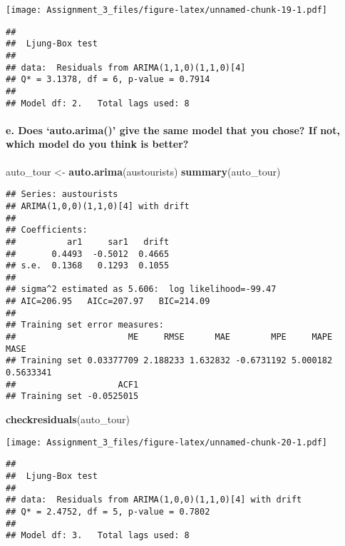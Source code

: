 \documentclass[]{article}
\newenvironment{Shaded}{\begin{snugshade}}{\end{snugshade}}
\newcommand{\KeywordTok}[1]{\textcolor[rgb]{0.13,0.29,0.53}{\textbf{#1}}}
\newcommand{\StringTok}[1]{\textcolor[rgb]{0.31,0.60,0.02}{#1}}
\newcommand{\NormalTok}[1]{#1}
\let\oldparagraph\paragraph
\renewcommand{\paragraph}[1]{\oldparagraph{#1}\mbox{}}
\begin{document}
\texttt{[image: Assignment\_3\_files/figure-latex/unnamed-chunk-19-1.pdf]}

\begin{verbatim}
## 
##  Ljung-Box test
## 
## data:  Residuals from ARIMA(1,1,0)(1,1,0)[4]
## Q* = 3.1378, df = 6, p-value = 0.7914
## 
## Model df: 2.   Total lags used: 8
\end{verbatim}

\paragraph{\texorpdfstring{e. Does `auto.arima()' give the same model
that you chose? If not, which model do you think is
better?}{e. Does auto.arima() give the same model that you chose? If not, which model do you think is better?}}\label{e.-does-auto.arima-give-the-same-model-that-you-chose-if-not-which-model-do-you-think-is-better}

\begin{Shaded}
\begin{Highlighting}[]
\NormalTok{auto_tour <-}\StringTok{ }\KeywordTok{auto.arima}\NormalTok{(austourists)}
\KeywordTok{summary}\NormalTok{(auto_tour)}
\end{Highlighting}
\end{Shaded}

\begin{verbatim}
## Series: austourists 
## ARIMA(1,0,0)(1,1,0)[4] with drift 
## 
## Coefficients:
##          ar1     sar1   drift
##       0.4493  -0.5012  0.4665
## s.e.  0.1368   0.1293  0.1055
## 
## sigma^2 estimated as 5.606:  log likelihood=-99.47
## AIC=206.95   AICc=207.97   BIC=214.09
## 
## Training set error measures:
##                      ME     RMSE      MAE        MPE     MAPE      MASE
## Training set 0.03377709 2.188233 1.632832 -0.6731192 5.000182 0.5633341
##                    ACF1
## Training set -0.0525015
\end{verbatim}

\begin{Shaded}
\begin{Highlighting}[]
\KeywordTok{checkresiduals}\NormalTok{(auto_tour)}
\end{Highlighting}
\end{Shaded}

\texttt{[image: Assignment\_3\_files/figure-latex/unnamed-chunk-20-1.pdf]}

\begin{verbatim}
## 
##  Ljung-Box test
## 
## data:  Residuals from ARIMA(1,0,0)(1,1,0)[4] with drift
## Q* = 2.4752, df = 5, p-value = 0.7802
## 
## Model df: 3.   Total lags used: 8
\end{verbatim}
\end{document}

